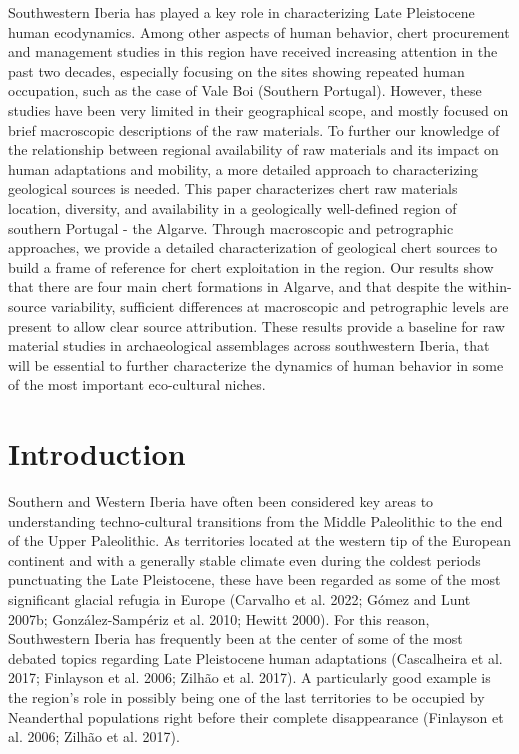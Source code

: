 \documentclass[
  a4paper,
  DIV=11,
  numbers=noendperiod]{scrreprt}
\begin{document}
Southwestern Iberia has played a key role in characterizing Late
Pleistocene human ecodynamics. Among other aspects of human behavior,
chert procurement and management studies in this region have received
increasing attention in the past two decades, especially focusing on the
sites showing repeated human occupation, such as the case of Vale Boi
(Southern Portugal). However, these studies have been very limited in
their geographical scope, and mostly focused on brief macroscopic
descriptions of the raw materials. To further our knowledge of the
relationship between regional availability of raw materials and its
impact on human adaptations and mobility, a more detailed approach to
characterizing geological sources is needed. This paper characterizes
chert raw materials location, diversity, and availability in a
geologically well-defined region of southern Portugal - the Algarve.
Through macroscopic and petrographic approaches, we provide a detailed
characterization of geological chert sources to build a frame of
reference for chert exploitation in the region. Our results show that
there are four main chert formations in Algarve, and that despite the
within-source variability, sufficient differences at macroscopic and
petrographic levels are present to allow clear source attribution. These
results provide a baseline for raw material studies in archaeological
assemblages across southwestern Iberia, that will be essential to
further characterize the dynamics of human behavior in some of the most
important eco-cultural niches.

\section{Introduction}\label{introduction-1}

Southern and Western Iberia have often been considered key areas to
understanding techno-cultural transitions from the Middle Paleolithic to
the end of the Upper Paleolithic. As territories located at the western
tip of the European continent and with a generally stable climate even
during the coldest periods punctuating the Late Pleistocene, these have
been regarded as some of the most significant glacial refugia in Europe
(Carvalho et al. 2022; Gómez and Lunt 2007b; González-Sampériz et al.
2010; Hewitt 2000). For this reason, Southwestern Iberia has frequently
been at the center of some of the most debated topics regarding Late
Pleistocene human adaptations (Cascalheira et al. 2017; Finlayson et al.
2006; Zilhão et al. 2017). A particularly good example is the region's
role in possibly being one of the last territories to be occupied by
Neanderthal populations right before their complete disappearance
(Finlayson et al. 2006; Zilhão et al. 2017).
\end{document}
